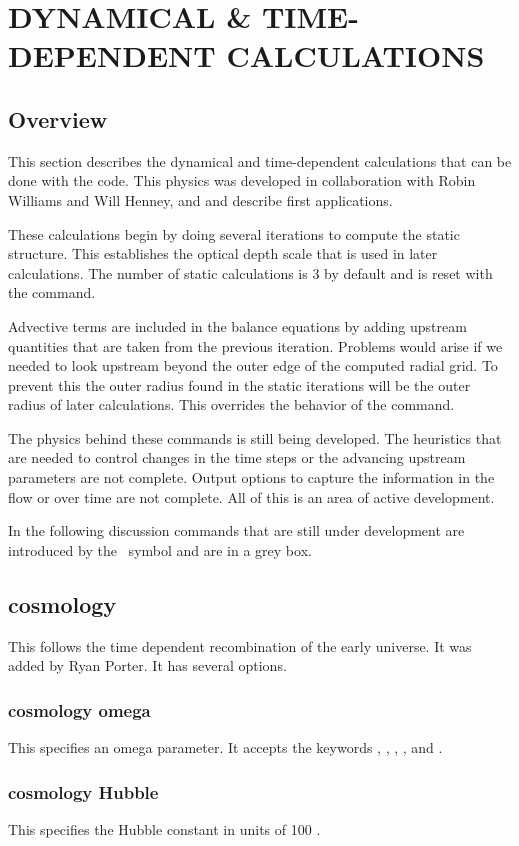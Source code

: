 \chapter{DYNAMICAL \& TIME-DEPENDENT CALCULATIONS}
\label{sec:DynamicalTimeDependent}

\section{Overview}

This section describes the dynamical and time-dependent calculations
that can be done with the code.
This physics was developed in collaboration
with Robin Williams and Will Henney, and \citet{Henney2005}
and \citet{Henney2007} describe first applications.

These calculations begin by doing several iterations to compute the static
structure.
This establishes the optical depth scale that is used in later
calculations. The number of static calculations is 3 by default and is
reset with the  command.

Advective terms are included in the balance equations by adding
upstream quantities that are taken from the previous iteration.
Problems would arise if we needed to look upstream beyond the
outer edge of the computed radial grid.
To prevent this the outer radius found in the static iterations will
be the outer radius of later calculations.
This overrides the behavior of the  command.

  The physics
behind these commands is still being developed.
The heuristics that are needed to control changes in the time steps or the
advancing upstream parameters are not complete.  Output options to capture
the information in the flow or over time are not complete.
All of this is an area of active development.

In the following discussion commands that are still under development are
introduced by the \experimental\ symbol and are in a grey box.

\begin{shaded}
\section{\experimental cosmology }
This follows the time dependent recombination of the early universe.
It was added by Ryan Porter.
It has several options.

\subsection{\experimental cosmology omega}
This specifies an omega parameter.
It accepts the keywords , ,
, , and .

\subsection{\experimental cosmology Hubble}
This specifies the Hubble constant in units of
100 \kmpspMpc.
\end{shaded}


